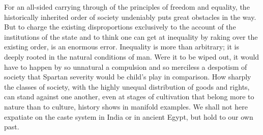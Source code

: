 \documentclass[12pt,a4paper,openany]{book}
\begin{document}
For an all-sided carrying through of the principles of freedom and
equality, the historically inherited
order of society undeniably puts great obstacles in the way. But
to charge the existing disproportions exclusively
to the account of the institutions of the state and to think one can get at
inequality by raking over the existing order,
is an enormous error. Inequality is more than arbitrary;
it is deeply rooted in the natural conditions of man.
Were it to be wiped out, it would have to happen by
so unnatural a compulsion and so merciless a despotism of society
that Spartan severity would be
child's play in comparison. How sharply
the classes of society, with the highly unequal distribution of
goods and rights, can stand against one another,
even at stages of cultivation that belong more to nature than
to culture, history shows in manifold examples. We
shall not here expatiate on the caste system in India
or in ancient Egypt, but hold to our own
past.
\end{document}
